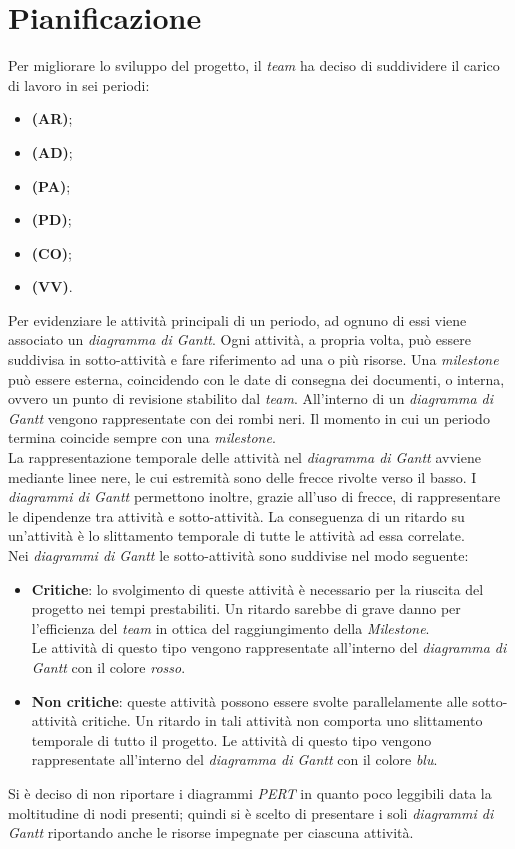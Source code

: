\newpage
\section{Pianificazione}
Per migliorare lo sviluppo del progetto, il \textit{team} ha deciso di suddividere il carico di lavoro in sei periodi:
\begin{itemize}
	\item \textbf{\AR (AR)};
	\item \textbf{\AD (AD)};
	\item \textbf{\PA (PA)};
	\item \textbf{\PD (PD)};
	\item \textbf{\CO (CO)};
	\item \textbf{\VV (VV)}.
\end{itemize}

Per evidenziare le attività principali di un periodo, ad ognuno di essi viene associato un \textit{diagramma di Gantt}. 
Ogni attività, a propria volta, può essere suddivisa in sotto-attività e fare riferimento ad una o più risorse.
Una \textit{milestone} può essere esterna, coincidendo con le date di consegna dei documenti, o interna, ovvero un punto di revisione stabilito dal \textit{team}. 
All'interno di un \textit{diagramma di Gantt} vengono rappresentate con dei rombi neri. 
Il momento in cui un periodo termina coincide sempre con una \textit{milestone}.\\ 
La rappresentazione temporale delle attività nel \textit{diagramma di Gantt} avviene mediante linee nere, le cui estremità sono delle frecce rivolte verso il basso. 
I \textit{diagrammi di Gantt} permettono inoltre, grazie all'uso di frecce, di rappresentare le dipendenze tra attività e sotto-attività.
La conseguenza di un ritardo su un'attività è lo slittamento temporale di tutte le attività ad essa correlate. \\

Nei \textit{diagrammi di Gantt} le sotto-attività sono suddivise nel modo seguente:
\begin{itemize}
	\item \textbf{Critiche}: lo svolgimento di queste attività è necessario per la riuscita del progetto nei tempi prestabiliti. Un ritardo sarebbe di grave danno per l'efficienza del \textit{team} in ottica del raggiungimento della \textit{Milestone}. \\ 
	Le attività di questo tipo vengono rappresentate all'interno del \textit{diagramma di Gantt} con il colore \textit{rosso}.
	\item \textbf{Non critiche}: queste attività possono essere svolte parallelamente alle sotto-attività critiche. Un ritardo in tali attività non comporta uno slittamento temporale di tutto il progetto.
	Le attività di questo tipo vengono rappresentate all'interno del \textit{diagramma di Gantt} con il colore \textit{blu}.
\end{itemize}
Si è deciso di non riportare i diagrammi \textit{PERT} in quanto poco leggibili data la moltitudine di nodi presenti; quindi si è scelto di presentare i soli \textit{diagrammi di Gantt} riportando anche le risorse impegnate per ciascuna attività.

